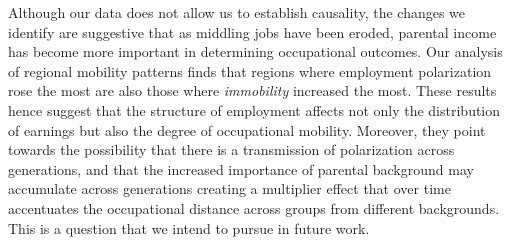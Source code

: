 Although our data does not allow us to establish causality, the changes we identify are suggestive that as middling jobs have been eroded, parental income has become more important in determining occupational outcomes. Our analysis of regional mobility patterns finds that regions where employment polarization rose the most are also those where \emph{immobility} increased the most. These results hence suggest that the structure of employment affects not only the distribution of earnings but also the degree of occupational mobility. Moreover, they point towards the possibility that there is a transmission of polarization across generations, and that the increased importance of parental background may accumulate across generations creating a multiplier effect that over time accentuates the occupational distance across groups from different backgrounds. This is a question that we intend to pursue in future work. 